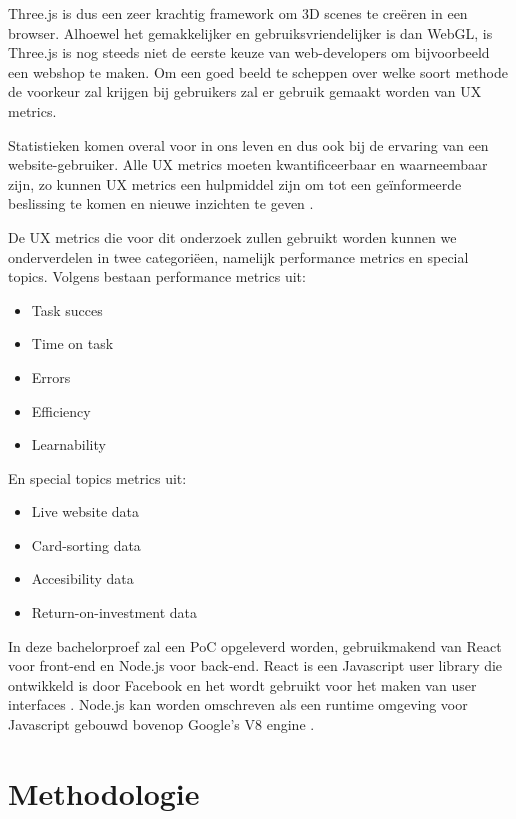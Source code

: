 Three.js is dus een zeer krachtig framework om 3D scenes te creëren in een browser. Alhoewel het gemakkelijker en gebruiksvriendelijker is dan WebGL, is Three.js is nog steeds niet de eerste keuze van web-developers om bijvoorbeeld een webshop te maken. Om een goed beeld te scheppen over welke soort methode de voorkeur zal krijgen bij gebruikers zal er gebruik gemaakt worden van UX metrics.

Statistieken komen overal voor in ons leven en dus ook bij de ervaring van een website-gebruiker. Alle UX metrics moeten kwantificeerbaar en waarneembaar zijn, zo kunnen UX metrics een hulpmiddel zijn om tot een geïnformeerde beslissing te komen en nieuwe inzichten te geven \autocite{Albert2013}.

De UX metrics die voor dit onderzoek zullen gebruikt worden kunnen we onderverdelen in twee categoriëen, namelijk performance metrics en special topics. Volgens \textcite{Albert2013} bestaan performance metrics uit: \begin{itemize}
	\item Task succes
	\item Time on task
	\item Errors
	\item Efficiency
	\item Learnability
\end{itemize}
En special topics metrics uit:
\begin{itemize}
	\item Live website data
	\item Card-sorting data
	\item Accesibility data
	\item Return-on-investment data
\end{itemize}

In deze bachelorproef zal een PoC opgeleverd worden, gebruikmakend van React voor front-end en Node.js voor back-end. React is een Javascript user library die ontwikkeld is door Facebook en het wordt gebruikt voor het maken van user interfaces \autocite{Banks2017}. Node.js kan worden omschreven als een runtime omgeving voor Javascript gebouwd bovenop Google's V8 engine \autocite{Satheesh2015}.
\section{Methodologie}%
\label{sec:methodologie}

